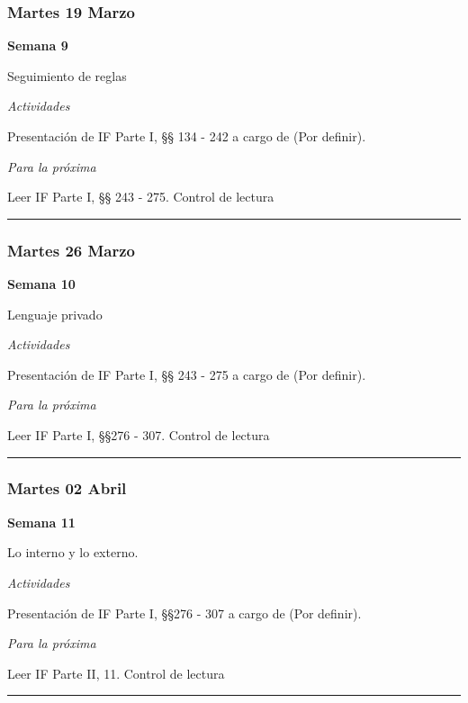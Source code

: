 \documentclass[spanish,]{article}
\begin{document}
\subsubsection{Martes 19 Marzo}\label{martes-19-marzo}

\textbf{Semana 9}

Seguimiento de reglas

\emph{Actividades}

Presentación de IF Parte I, §§ 134 - 242 a cargo de (Por definir).

\emph{Para la próxima}

Leer IF Parte I, §§ 243 - 275. Control de lectura

\begin{center}\rule{0.5\linewidth}{\linethickness}\end{center}

\subsubsection{Martes 26 Marzo}\label{martes-26-marzo}

\textbf{Semana 10}

Lenguaje privado

\emph{Actividades}

Presentación de IF Parte I, §§ 243 - 275 a cargo de (Por definir).

\emph{Para la próxima}

Leer IF Parte I, §§276 - 307. Control de lectura

\begin{center}\rule{0.5\linewidth}{\linethickness}\end{center}

\subsubsection{Martes 02 Abril}\label{martes-02-abril}

\textbf{Semana 11}

Lo interno y lo externo.

\emph{Actividades}

Presentación de IF Parte I, §§276 - 307 a cargo de (Por definir).

\emph{Para la próxima}

Leer IF Parte II, 11. Control de lectura

\begin{center}\rule{0.5\linewidth}{\linethickness}\end{center}
\end{document}
